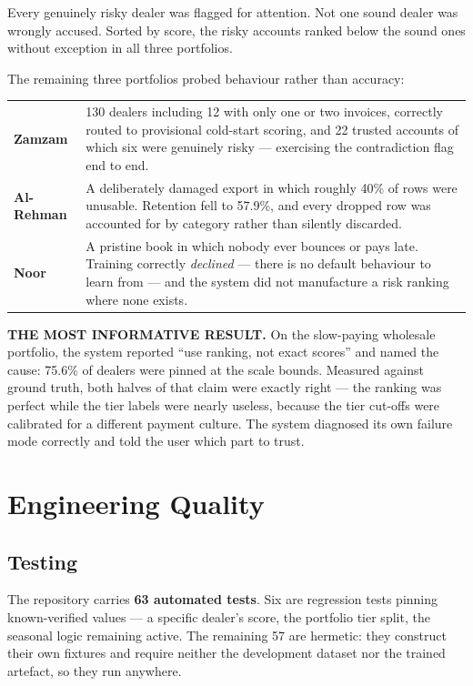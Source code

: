 \documentclass[11pt,a4paper]{article}
\newcommand{\lab}[1]{{\color{navy}\bfseries\footnotesize #1}}
\begin{document}
\vspace{-2pt}
Every genuinely risky dealer was flagged for attention. Not one sound dealer was
wrongly accused. Sorted by score, the risky accounts ranked below the sound ones
without exception in all three portfolios.

The remaining three portfolios probed behaviour rather than accuracy:

\begin{tabularx}{\textwidth}{@{}p{3.1cm}X@{}}
\lab{Zamzam} & 130 dealers including 12 with only one or two invoices, correctly
routed to provisional cold-start scoring, and 22 trusted accounts of which six
were genuinely risky --- exercising the contradiction flag end to end. \\
\lab{Al-Rehman} & A deliberately damaged export in which roughly 40\% of rows
were unusable. Retention fell to 57.9\%, and every dropped row was accounted for
by category rather than silently discarded. \\
\lab{Noor} & A pristine book in which nobody ever bounces or pays late. Training
correctly \emph{declined} --- there is no default behaviour to learn from --- and
the system did not manufacture a risk ranking where none exists. \\
\end{tabularx}

\begin{callout}
\lab{THE MOST INFORMATIVE RESULT.} On the slow-paying wholesale portfolio, the
system reported ``use ranking, not exact scores'' and named the cause: 75.6\% of
dealers were pinned at the scale bounds. Measured against ground truth, both
halves of that claim were exactly right --- the ranking was perfect while the
tier labels were nearly useless, because the tier cut-offs were calibrated for a
different payment culture. The system diagnosed its own failure mode correctly
and told the user which part to trust.
\end{callout}

\section{Engineering Quality}

\subsection{Testing}

The repository carries \textbf{63 automated tests}. Six are regression tests
pinning known-verified values --- a specific dealer's score, the portfolio tier
split, the seasonal logic remaining active. The remaining 57 are hermetic:
they construct their own fixtures and require neither the development dataset
nor the trained artefact, so they run anywhere.
\end{document}
